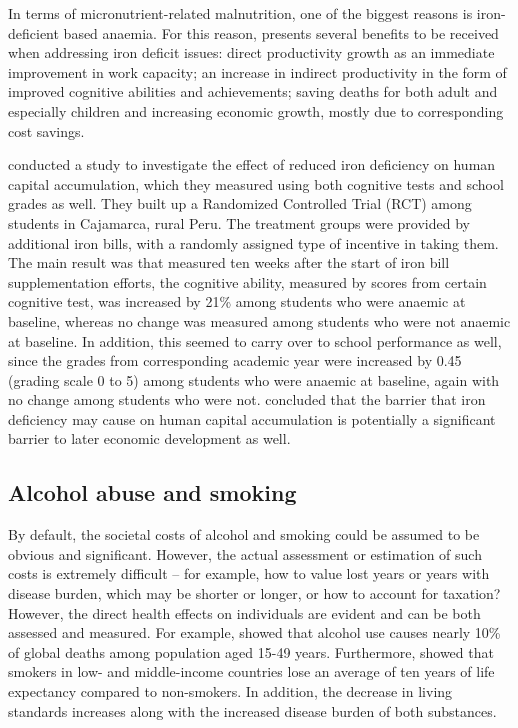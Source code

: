 \documentclass[12pt,a4paper,notitlepage]{article}
\begin{document}
In terms of micronutrient-related malnutrition, one of the biggest reasons is iron-deficient based anaemia. For this reason, \citet{Hunt:2002} presents several benefits to be received when addressing iron deficit issues: direct productivity growth as an immediate improvement in work capacity; an increase in indirect productivity in the form of improved cognitive abilities and achievements; saving deaths for both adult and especially children and increasing economic growth, mostly due to corresponding cost savings. 

\citet{Chong:2016} conducted a study to investigate the effect of reduced iron deficiency on human capital accumulation, which they measured using both cognitive tests and school grades as well. They built up a Randomized Controlled Trial (RCT) among students in Cajamarca, rural Peru. The treatment groups were provided by additional iron bills, with a randomly assigned type of incentive in taking them. The main result was that measured ten weeks after the start of iron bill supplementation efforts, the cognitive ability, measured by scores from certain cognitive test, was increased by 21\% among students who were anaemic at baseline, whereas no change was measured among students who were not anaemic at baseline. In addition, this seemed to carry over to school performance as well, since the grades from corresponding academic year were increased by 0.45 (grading scale 0 to 5) among students who were anaemic at baseline, again with no change among students who were not. \citet{Chong:2016} concluded that the barrier that iron deficiency may cause on human capital accumulation is potentially a significant barrier to later economic development as well.

\subsection{Alcohol abuse and smoking}

By default, the societal costs of alcohol and smoking could be assumed to be obvious and significant. However, the actual assessment or estimation of such costs is extremely difficult -- for example, how to value lost years or years with disease burden, which may be shorter or longer, or how to account for taxation? However, the direct health effects on individuals are evident and can be both assessed and measured. For example, \cite{Griswold:2016} showed that alcohol use causes nearly 10\% of global deaths among population aged 15-49 years. Furthermore, \cite{Jha:2014} showed that smokers in low- and middle-income countries lose an average of ten years of life expectancy compared to non-smokers. In addition, the decrease in living standards increases along with the increased disease burden of both substances.
\end{document}
